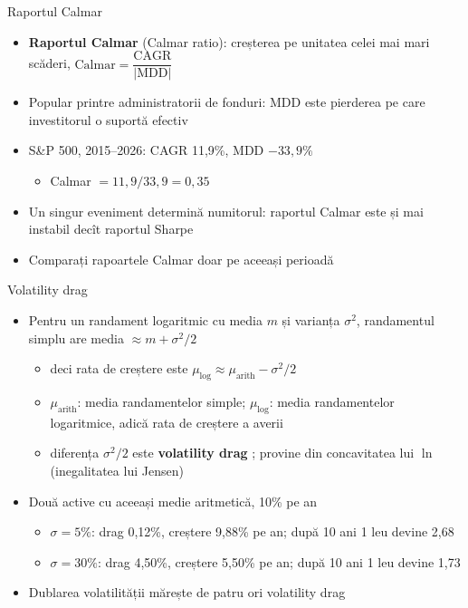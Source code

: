 \begin{frame}{Raportul Calmar}
\itemsize{\small}
\begin{itemize}
    \item \textbf{Raportul Calmar} (Calmar ratio): creșterea pe unitatea celei mai mari scăderi, $\text{Calmar} = \dfrac{\text{CAGR}}{|\text{MDD}|}$
    \item Popular printre administratorii de fonduri: MDD este pierderea pe care investitorul o suportă efectiv
    \item S\&P 500, 2015--2026: CAGR 11{,}9\%, MDD $-33{,}9\%$
    \begin{itemize}
        \item Calmar $= 11{,}9/33{,}9 = 0{,}35$
    \end{itemize}
    \item Un singur eveniment determină numitorul: raportul Calmar este și mai instabil decît raportul Sharpe
    \item Comparați rapoartele Calmar doar pe aceeași perioadă
\end{itemize}
\end{frame}

\begin{frame}{Volatility drag}
\itemsize{\small}
\begin{itemize}
    \item Pentru un randament logaritmic cu media $m$ și varianța $\sigma^2$, randamentul simplu are media $\approx m + \sigma^2/2$
    \begin{itemize}
        \item deci rata de creștere este $\mu_{\text{log}} \approx \mu_{\text{arith}} - \sigma^2/2$
        \item $\mu_{\text{arith}}$: media randamentelor simple; $\mu_{\text{log}}$: media randamentelor logaritmice, adică rata de creștere a averii
        \item diferența $\sigma^2/2$ este \textbf{volatility drag} ; provine din concavitatea lui $\ln$ (inegalitatea lui Jensen)
    \end{itemize}
    \item Două active cu aceeași medie aritmetică, 10\% pe an
    \begin{itemize}
        \item $\sigma = 5\%$: drag 0{,}12\%, creștere 9{,}88\% pe an; după 10 ani 1 leu devine 2{,}68
        \item $\sigma = 30\%$: drag 4{,}50\%, creștere 5{,}50\% pe an; după 10 ani 1 leu devine 1{,}73
    \end{itemize}
    \item Dublarea volatilității mărește de patru ori volatility drag
\end{itemize}
\end{frame}

